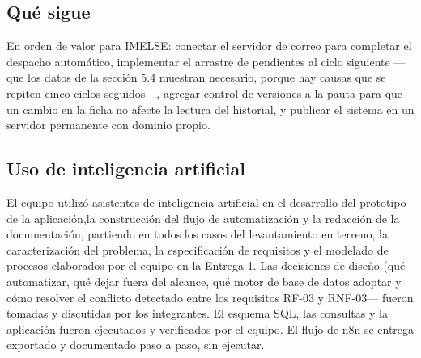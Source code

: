 \documentclass[10pt,letterpaper]{article}
\begin{document}
\subsection{Qué sigue}

En orden de valor para IMELSE: conectar el servidor de correo para completar el
despacho automático, implementar el arrastre de pendientes al ciclo siguiente
—que los datos de la sección 5.4 muestran necesario, porque hay causas que se
repiten cinco ciclos seguidos—, agregar control de versiones a la pauta para
que un cambio en la ficha no afecte la lectura del historial, y publicar el
sistema en un servidor permanente con dominio propio.
\newpage
\subsection{Uso de inteligencia artificial}

El equipo utilizó asistentes de inteligencia artificial en el desarrollo del prototipo de la aplicación,la construcción del flujo de automatización y la redacción de la documentación, partiendo en todos los casos del levantamiento en terreno, la caracterización del problema, la especificación de requisitos y el modelado de procesos elaborados por el equipo en la Entrega 1. Las decisiones de diseño (qué automatizar, qué dejar fuera del alcance, qué motor de base de datos adoptar y
cómo resolver el conflicto detectado entre los requisitos RF-03 y RNF-03—
fueron tomadas y discutidas por los integrantes. El esquema SQL, las consultas y la aplicación fueron ejecutados y verificados por el equipo. El flujo de n8n se entrega exportado y documentado paso a paso, sin ejecutar.
\end{document}
